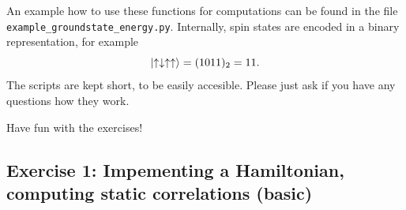 \documentclass[]{article}
\theoremstyle{definition}
\begin{document}
An example how to use these functions for computations can be found in
the file \texttt{example\_groundstate\_energy.py}. Internally, spin
states are encoded in a binary representation, for example
\begin{equation}
  \ket{\uparrow\downarrow\uparrow \uparrow} = (1011)_2 = 11.
\end{equation}
The scripts are kept short, to be easily accesible. Please just ask if
you have any questions how they work.

\begin{center}
  Have fun with the exercises!
\end{center}


\newpage
\subsection*{Exercise 1: Impementing a Hamiltonian, computing static
  correlations (basic)}
\end{document}
